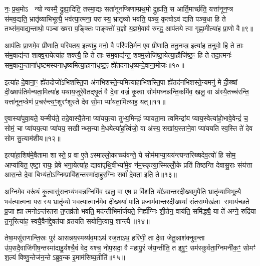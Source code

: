 नः॒ प्र॒थ॒मोऽ  न्योन्यस्मै॒ द्रुह्या॒दिति॒ तस्मा॒द्यः सता॑नूनप्त्रिणाम्प्रथ॒मो द्रुह्य॑ति॒ स आर्ति॒मार्च्छ॑ति॒ यत्ता॑नून॒प्त्र स॑मव॒द्यति॒ भ्रातृ॑व्याभिभूत्यै॒ भव॑त्या॒त्मना॒ परास्य॒ भ्रातृ॑व्यो भवति॒ पञ्च॒ कृत्वोऽव॑ द्यति पञ्च॒धा हि ते तथ्स॑म॒वाद्य॒न्ताथो॒ पञ्चाख्षरा प॒ङ्क्तिः पाङ्क्तो॑ य॒ज्ञो य॒ज्ञमे॒वाव॑ रुन्द्ध॒ आप॑तये त्वा गृह्णा॒मीत्या॑ह प्रा॒णो वै॥९॥

आप॑तिः प्रा॒णमे॒व प्री॑णाति॒ परि॑पतय॒ इत्या॑ह॒ मनो॒ वै परि॑पति॒र्मन॑ ए॒व प्री॑णाति॒ तनू॒नप्त्र॒ इत्या॑ह त॒नुवो॒ हि ते ताः स॑म॒वाद्य॑न्त शाक्व॒रायेत्या॑ह॒ शक्त्यै॒ हि ते ताः स॑म॒वाद्य॑न्त॒ शक्म॒न्नोजि॑ष्ठा॒येत्या॒हौजि॑ष्ठ॒ꣳ॒ हि ते तदा॒त्मनः॑ सम॒वाद्य॒न्ताना॑धृष्टमस्यनाधृ॒ष्यमित्या॒हाना॑धृष्ट॒ꣵ॒ ह्ये॑तद॑नाधृ॒ष्यन्दे॒वाना॒मोजः॑॥१०॥

इत्या॑ह दे॒वाना॒ꣳ॒ ह्ये॑तदोजो॑ऽभिशस्ति॒पा अ॑नभिशस्ते॒न्यमित्या॑हाभिशस्ति॒पा ह्ये॑तद॑नभिशस्ते॒न्यमनु॑ मे दी॒ख्षां दी॒ख्षाप॑तिर्मन्यता॒मित्या॑ह यथाय॒जुरे॒वैतद्घृ॒तं वै दे॒वा वज्रं॑ कृ॒त्वा सोम॑मघ्नन्नन्ति॒कमि॑व॒ खलु॒ वा अ॑स्यै॒तच्च॑रन्ति॒ यत्ता॑नून॒प्त्रेण॑ प्र॒चर॑न्त्य॒ꣳ॒शुरꣳ॑शुस्ते देव सो॒मा प्या॑यता॒मित्या॑ह॒ यत्॥११॥

ए॒वास्या॑पुवा॒यते॒ यन्मीय॑ते॒ तदे॒वास्यै॒तेना प्या॑यय॒त्या तुभ्य॒मिन्द्रः॑ प्यायता॒मा त्वमिन्द्रा॑य प्याय॒स्वेत्या॑हो॒भावे॒वेन्द्रं॑ च॒ सोमं॒ चा प्या॑यय॒त्या प्या॑यय॒ सखीन्थ्स॒न्या मे॒धयेत्या॑ह॒र्त्विजो॒ वा अ॑स्य॒ सखा॑य॒स्ताने॒वा प्या॑ययति स्व॒स्ति ते॑ देव सोम सु॒त्याम॑शीय॥१२॥

इत्या॑हा॒शिष॑मे॒वैतामा शास्ते॒ प्र वा ए॒तेऽस्माल्लो॒काच्च्य॑वन्ते॒ ये सोम॑माप्या॒यय॑न्त्यन्तरिख्षदेव॒त्यो॑ हि सोम॒ आप्या॑यित॒ एष्टा॒ रायः॒ प्रेषे भगा॒येत्या॑ह॒ द्यावा॑पृथि॒वीभ्या॑मे॒व न॑म॒स्कृत्या॒स्मिल्लोँ॒के प्रति॑ तिष्ठन्ति देवासु॒राः संय॑त्ता आस॒न्ते दे॒वा बिभ्य॑तो॒ऽग्निम्प्रावि॑श॒न्तस्मा॑दाहुर॒ग्निः सर्वा॑ दे॒वता॒ इति॒ ते॥१३॥

अ॒ग्निमे॒व वरू॑थं कृ॒त्वासु॑रान॒भ्य॑भवन्न॒ग्निमि॑व॒ खलु॒ वा ए॒ष प्र वि॑शति॒ यो॑ऽवान्तरदी॒ख्षामु॒पैति॒ भ्रातृ॑व्याभिभूत्यै॒ भव॑त्या॒त्मना॒ परास्य॒ भ्रातृ॑व्यो भवत्या॒त्मान॑मे॒व दी॒ख्षया॑ पाति प्र॒जाम॑वान्तरदी॒ख्षया॑ संत॒राम्मेख॑ला स॒माय॑च्छते प्र॒जा ह्यात्मनोऽन्त॑रतरा त॒प्तव्र॑तो भवति॒ मद॑न्तीभिर्मार्जयते॒ निर्\mbox{}ह्य॑ग्निः शी॒तेन॒ वाय॑ति॒ समि॑द्ध्यै॒ या ते॑ अग्ने॒ रुद्रि॑या त॒नूरित्या॑ह॒ स्वयै॒वैन॑द्दे॒वत॑या व्रतयति सयोनि॒त्वाय॒ शान्त्यै॥१४॥

{\anuvakamend[{यो वा ओज॑ आह॒ यद॑शी॒येति॒ तेऽग्न॒ एका॑दश च॥२॥}]}

तेषा॒मसु॑राणान्ति॒स्रः पुर॑ आसन्नय॒स्मय्य॑व॒माऽथ॑ रज॒ताऽथ॒ हरि॑णी॒ ता दे॒वा जेतु॒न्नाश॑क्नुव॒न्ता उ॑प॒सदै॒वाजि॑गीष॒न्तस्मा॑दाहु॒र्यश्चै॒वं वेद॒ यश्च॒ नोप॒सदा॒ वै म॑हापु॒रं ज॑य॒न्तीति॒ त इषु॒ꣳ॒ सम॑स्कुर्वता॒ग्निमनी॑क॒ꣳ॒ सोमꣳ॑ श॒ल्यं विष्णु॒न्तेज॑न॒न्तेऽब्रुव॒न्क इ॒माम॑सिष्य॒तीति॑॥१५॥

